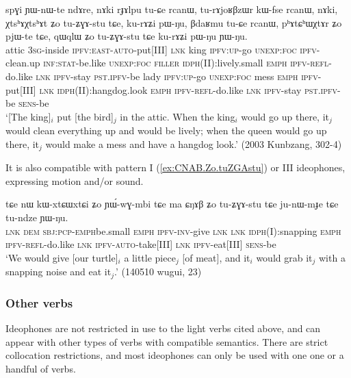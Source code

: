  
\begin{exe}
\ex \label{ex:XtshAXtshAt.Zo.tuZGAstu}
\gll spɣi ɲɯ-nɯ-te ndɤre, nɤki rɟɤlpu tu-ɕe rcanɯ, tu-rɤjoʁβzɯr kɯ-fse rcanɯ, nɤki, χtsʰɤχtsʰɤt ʑo tu-ʑɣɤ-stu tɕe, ku-rɤʑi pɯ-ŋu, βdaʁmu tu-ɕe rcanɯ, pʰɤtɕʰɯχtɤr ʑo pjɯ-te tɕe, qɯqlɯ ʑo tu-ʑɣɤ-stu tɕe ku-rɤʑi pɯ-ŋu ɲɯ-ŋu. 	\\
attic \textsc{3sg}-inside \textsc{ipfv}:\textsc{east}-\textsc{auto}-put[III] \textsc{lnk} king  \textsc{ipfv}:\textsc{up}-go \textsc{unexp}:\textsc{foc} \textsc{ipfv}-clean.up \textsc{inf}:\textsc{stat}-be.like  \textsc{unexp}:\textsc{foc} \textsc{filler}  \textsc{idph}(II):lively.small \textsc{emph} \textsc{ipfv}-\textsc{refl}-do.like \textsc{lnk} \textsc{ipfv}-stay \textsc{pst}.\textsc{ipfv}-be  lady  \textsc{ipfv}:\textsc{up}-go  \textsc{unexp}:\textsc{foc} mess \textsc{emph} \textsc{ipfv}-put[III] \textsc{lnk} \textsc{idph}(II):hangdog.look \textsc{emph} \textsc{ipfv}-\textsc{refl}-do.like \textsc{lnk} \textsc{ipfv}-stay \textsc{pst}.\textsc{ipfv}-be \textsc{sens}-be \\
\glt `[The king]$_i$ put [the bird]$_j$ in the attic. When the king$_i$  would go up there, it$_j$ would clean everything up and would be lively; when the queen would go up there, it$_j$ would make a mess and have a hangdog look.' (2003 Kunbzang, 302-4)
\end{exe}

It is also compatible with pattern I (\ref{ex:CNAB.Zo.tuZGAstu}) or III ideophones, expressing motion and/or sound.

\begin{exe}
\ex \label{ex:CNAB.Zo.tuZGAstu}
\gll tɕe nɯ kɯ-xtɕɯ\redp{}xtɕi ʑo ɲɯ́-wɣ-mbi tɕe ma ɕŋɤβ ʑo tu-ʑɣɤ-stu tɕe ju-nɯ-mɟe tɕe tu-ndze ɲɯ-ŋu. \\
\textsc{lnk} \textsc{dem} \textsc{sbj}:\textsc{pcp}-\textsc{emph}\redp{}be.small \textsc{emph} \textsc{ipfv}-\textsc{inv}-give \textsc{lnk} \textsc{lnk} \textsc{idph}(I):snapping \textsc{emph} \textsc{ipfv}-\textsc{refl}-do.like \textsc{lnk} \textsc{ipfv}-\textsc{auto}-take[III] \textsc{lnk} \textsc{ipfv}-eat[III] \textsc{sens}-be \\
\glt `We would give [our turtle]$_i$ a little piece$_j$ [of meat], and it$_i$ would grab it$_j$ with a snapping noise and eat it$_j$.' (140510 wugui, 23)
\end{exe}

\subsubsection{Other verbs} \label{sec:ideophone.plus.lexical.verb}
Ideophones are not restricted in use to the light verbs cited above, and can appear with other types of verbs with compatible semantics. There are strict collocation restrictions, and most ideophones can only be used with one one or a handful of verbs. 

